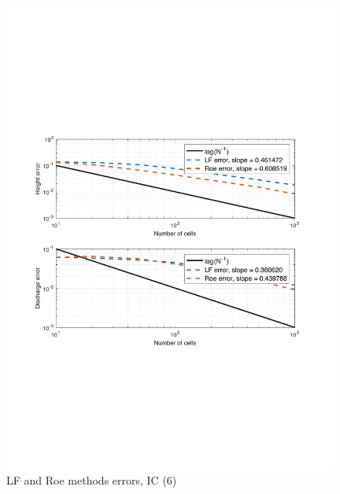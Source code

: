 \documentclass[11pt,a4paper]{article}
\begin{document}
\begin{figure}[!htb]
    \centering
    \includegraphics[width=11cm]{pictures/IC_3_error.pdf}
    \caption{LF and Roe methods errors, IC (6)}
    \label{fig:IC_3_errors}
\end{figure}
\end{document}
